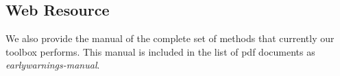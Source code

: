\documentclass[12pt,a4paper,final]{article}
\begin{document}
\begin{doublespacing}
\newpage
\section{Web Resource}
We also provide the manual of the complete set of methods that currently our toolbox performs. This manual is included in the list of pdf documents as \textit{earlywarnings-manual}.

\end{doublespacing}
\end{document}
